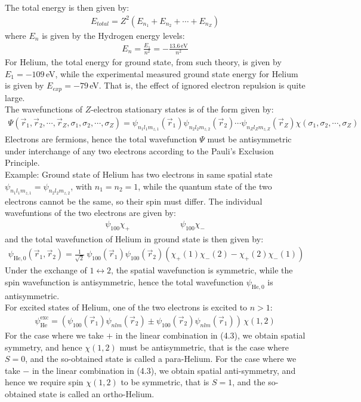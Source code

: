 \documentclass[11pt]{book}
\theoremstyle{break}
\theoremstyle{break}
\newcommand{\example}{\color{green}Example: \color{black}}
\begin{document}
The total energy is then given by:
\begin{align*}
E_{total} = Z^2(E_{n_1} + E_{n_2} + \cdots + E_{n_Z})
\end{align*}
where $E_n$ is given by the Hydrogen energy levels:
\begin{align*}
E_n = \frac{E_1}{n^2} = -\frac{13.6\, \text{eV}}{n^2}
\end{align*}
For Helium, the total energy for ground state, from such theory, is given by $E_1 = -109\, $eV, while the experimental measured ground state energy for Helium is given by $E_{exp} = -79 \,$eV. That is, the effect of ignored electron repulsion is quite large.\\

The wavefunctions of $Z$-electron stationary states is of the form given by:
\begin{align*}
\Psi\left(\vec{r}_1,\vec{r}_2,\cdots, \vec{r}_Z, \sigma_1,\sigma_2,\cdots,\sigma_Z\right)  = \psi_{n_1l_1m_{z,1}}(\vec{r}_1) \psi_{n_2l_2m_{z,2}}(\vec{r}_2)\cdots  \psi_{n_Zl_Zm_{z,Z}}(\vec{r}_Z)\chi(\sigma_1,\sigma_2,\cdots, \sigma_Z)
\end{align*}
Electrons are fermions, hence the total wavefunction $\Psi$ must be antisymmetric under interchange of any two electrons according to the Pauli's Exclusion Principle. \\

\example Ground state of Helium has two electrons in same spatial state $\psi_{n_1l_1m_{z,1}} =\psi_{n_2l_2m_{z,2}} $, with $n_1 = n_2 =1$, while the quantum state of the two electrons cannot be the same, so their spin must differ. The individual wavefuntions of the two electrons are given by:
\begin{align*}
\psi_{100}\chi_{+}\qquad\qquad\qquad \psi_{100}\chi_-
\end{align*}
and the total wavefunction of Helium in ground state is then given by:
\begin{align*}
\psi_{\text{He}, 0}(\vec{r}_1,\vec{r}_2) =\frac{1}{\sqrt{2}}\ \psi_{100}(\vec{r}_1)\psi_{100}(\vec{r}_2) \left( \chi_+(1) \chi_-(2) - \chi_+(2)\chi_-(1)\right)
\end{align*}
Under the exchange of $1\leftrightarrow 2$, the spatial wavefunction is symmetric, while the spin wavefunction is antisymmetric, hence the total wavefunction $\psi_{\text{He}, 0}$ is antisymmetric.\\


For excited states of Helium, one of the two electrons is excited to $n>1$:
\begin{align}
\psi_{\text{He}}^{\text{exc}} = \left( \psi_{100}(\vec{r}_1) \psi_{nlm}(\vec{r}_2) \pm \psi_{100}(\vec{r}_2) \psi_{nlm}(\vec{r}_1) \right)\, \chi(1,2)
\end{align}
For the case where we take $+$ in the linear combination in (4.3), we obtain spatial symmetry, and hence $\chi(1,2)$ must be antisymmetric, that is the case where $S= 0$, and the so-obtained state is called a para-Helium. For the case where we take $-$ in the linear combination in (4.3), we obtain spatial anti-symmetry, and hence we require spin $\chi(1,2)$ to be symmetric, that is $S=1$, and the so-obtained state is called an ortho-Helium. \\
\end{document}
